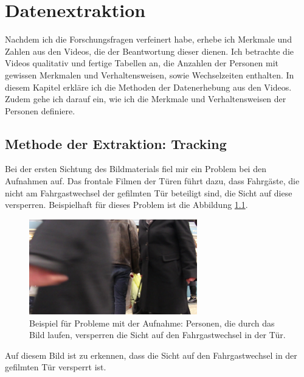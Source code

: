 \chapter{Datenextraktion} \label{Datenerhebung}
Nachdem ich die Forschungsfragen verfeinert habe, erhebe ich Merkmale und Zahlen aus den Videos, die der Beantwortung dieser dienen. Ich betrachte die Videos qualitativ und fertige Tabellen an, die Anzahlen der Personen mit gewissen Merkmalen und Verhaltensweisen, sowie Wechselzeiten enthalten. In diesem Kapitel erkläre ich die Methoden der Datenerhebung aus den Videos. Zudem gehe ich darauf ein, wie ich die Merkmale und Verhaltensweisen der Personen definiere.
\section{Methode der Extraktion: Tracking}\label{Tracking}
Bei der ersten Sichtung des Bildmaterials fiel mir ein Problem bei den Aufnahmen auf. Das frontale Filmen der Türen führt dazu, dass Fahrgäste, die nicht am Fahrgastwechsel der gefilmten Tür beteiligt sind, die Sicht auf diese versperren. Beispielhaft für dieses Problem ist die Abbildung \ref{fig:Problem bei Videos}.
\begin{figure}[H]
	\centering
		\includegraphics[width=0.65\textwidth]{pictures/data_extraction/tracking/problem.jpg}
	\caption{Beispiel für Probleme mit der Aufnahme: Personen, die durch das Bild laufen, versperren die Sicht auf den Fahrgastwechsel in der Tür.}
	\label{fig:Problem bei Videos}
\end{figure} 
Auf diesem Bild ist zu erkennen, dass die Sicht auf den Fahrgastwechsel in der gefilmten Tür versperrt ist.\\

